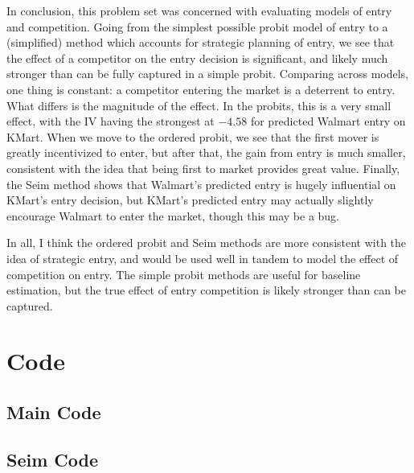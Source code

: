 \documentclass[11pt]{article}
\theoremstyle{definition}
\theoremstyle{remark}
\begin{document}
In conclusion, this problem set was concerned with evaluating models of entry and competition. Going from the simplest possible probit model of entry to a (simplified) method which accounts for strategic planning of entry, we see that the effect of a competitor on the entry decision is significant, and likely much stronger than can be fully captured in a simple probit. Comparing across models, one thing is constant: a competitor entering the market is a deterrent to entry. What differs is the magnitude of the effect. In the probits, this is a very small effect, with the IV having the strongest at $-4.58$ for predicted Walmart entry on KMart. When we move to the ordered probit, we see that the first mover is greatly incentivized to enter, but after that, the gain from entry is much smaller, consistent with the idea that being first to market provides great value. Finally, the Seim method shows that Walmart's predicted entry is hugely influential on KMart's entry decision, but KMart's predicted entry may actually slightly encourage Walmart to enter the market, though this may be a bug. 

In all, I think the ordered probit and Seim methods are more consistent with the idea of strategic entry, and would be used well in tandem to model the effect of competition on entry. The simple probit methods are useful for baseline estimation, but the true effect of entry competition is likely stronger than can be captured.


\newpage


\newpage
\appendix

\section{Code}

\subsection{Main Code}



\subsection{Seim Code}

\end{document}
